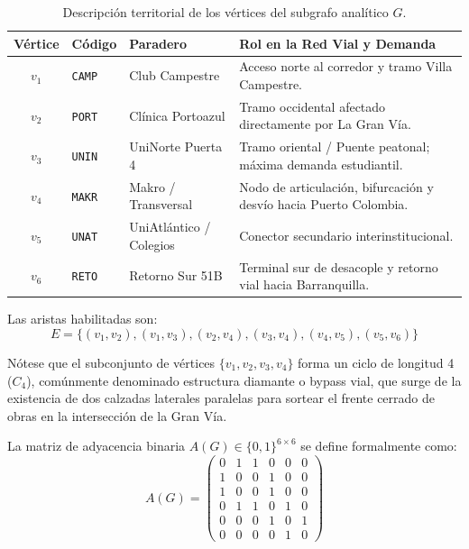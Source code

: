 \documentclass[11pt,letterpaper]{article}
\begin{document}
\begin{table}[H]
\centering
\caption{Descripción territorial de los vértices del subgrafo analítico $G$.}
\label{tab:paraderos}
\begin{tabular}{cllp{7cm}}
\toprule
\textbf{Vértice} & \textbf{Código} & \textbf{Paradero} & \textbf{Rol en la Red Vial y Demanda} \\
\midrule
$v_1$ & \texttt{CAMP} & Club Campestre & Acceso norte al corredor y tramo Villa Campestre. \\
$v_2$ & \texttt{PORT} & Clínica Portoazul & Tramo occidental afectado directamente por La Gran Vía. \\
$v_3$ & \texttt{UNIN} & UniNorte Puerta 4 & Tramo oriental / Puente peatonal; máxima demanda estudiantil. \\
$v_4$ & \texttt{MAKR} & Makro / Transversal & Nodo de articulación, bifurcación y desvío hacia Puerto Colombia. \\
$v_5$ & \texttt{UNAT} & UniAtlántico / Colegios & Conector secundario interinstitucional. \\
$v_6$ & \texttt{RETO} & Retorno Sur 51B & Terminal sur de desacople y retorno vial hacia Barranquilla. \\
\bottomrule
\end{tabular}
\end{table}

Las aristas habilitadas son:
\begin{equation}
E = \big\{(v_1, v_2), (v_1, v_3), (v_2, v_4), (v_3, v_4), (v_4, v_5), (v_5, v_6)\big\}
\end{equation}

Nótese que el subconjunto de vértices $\{v_1, v_2, v_3, v_4\}$ forma un ciclo de longitud 4 ($C_4$), comúnmente denominado estructura diamante o bypass vial, que surge de la existencia de dos calzadas laterales paralelas para sortear el frente cerrado de obras en la intersección de la Gran Vía. 

La matriz de adyacencia binaria $A(G) \in \{0, 1\}^{6 \times 6}$ se define formalmente como:
\begin{equation}
A(G) = \begin{pmatrix}
0 & 1 & 1 & 0 & 0 & 0 \\
1 & 0 & 0 & 1 & 0 & 0 \\
1 & 0 & 0 & 1 & 0 & 0 \\
0 & 1 & 1 & 0 & 1 & 0 \\
0 & 0 & 0 & 1 & 0 & 1 \\
0 & 0 & 0 & 0 & 1 & 0
\end{pmatrix}
\end{equation}
\end{document}
